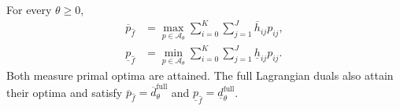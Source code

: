 \begin{lemma}
  \label{lem-app-full-duality}
  For every $\theta\ge0$,
  \begin{align}
    \overline p_{\hat f}
    &=\max_{p\in\mathcal A_\theta}\sum_{i=0}^K\sum_{j=1}^J\overline h_{ij}p_{ij},
    \label{eq-finite-primal-values}\\
    \underline p_{\hat f}
    &=\min_{p\in\mathcal A_\theta}\sum_{i=0}^K\sum_{j=1}^J\underline h_{ij}p_{ij}.
    \label{eq-app-finite-lower-primal}
  \end{align}
  Both measure primal optima are attained. The full Lagrangian duals also attain their optima and satisfy
  $\overline p_{\hat f}=\overline d_\theta^{\mathrm{full}}$ and
  $\underline p_{\hat f}=\underline d_\theta^{\mathrm{full}}$.
\end{lemma}
